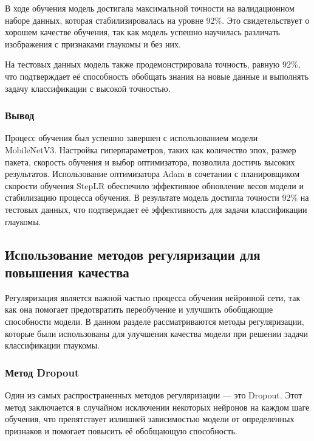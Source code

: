 {    В ходе обучения модель достигала максимальной точности на валидационном наборе данных, которая стабилизировалась на уровне 92\%. Это свидетельствует о хорошем качестве обучения, так как модель успешно научилась различать изображения с признаками глаукомы и без них.

    На тестовых данных модель также продемонстрировала точность, равную 92\%, что подтверждает её способность обобщать знания на новые данные и выполнять задачу классификации с высокой точностью.

    \subsubsection*{Вывод}

    Процесс обучения был успешно завершен с использованием модели MobileNetV3. Настройка гиперпараметров, таких как количество эпох, размер пакета, скорость обучения и выбор оптимизатора, позволила достичь высоких результатов. Использование оптимизатора Adam в сочетании с планировщиком скорости обучения StepLR обеспечило эффективное обновление весов модели и стабилизацию процесса обучения. В результате модель достигла точности 92\% на тестовых данных, что подтверждает её эффективность для задачи классификации глаукомы.


    \subsection{Использование методов регуляризации для повышения качества}

    Регуляризация является важной частью процесса обучения нейронной сети, так как она помогает предотвратить переобучение и улучшить обобщающие способности модели. В данном разделе рассматриваются методы регуляризации, которые были использованы для улучшения качества модели при решении задачи классификации глаукомы.

    \subsubsection*{Метод Dropout}

    Один из самых распространенных методов регуляризации — это Dropout. Этот метод заключается в случайном исключении некоторых нейронов на каждом шаге обучения, что препятствует излишней зависимостью модели от определенных признаков и помогает повысить её обобщающую способность.

}

